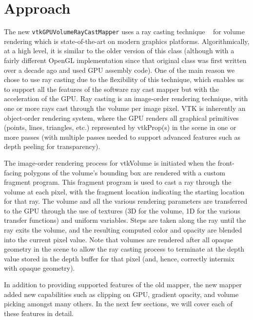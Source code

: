 \section{Approach}
\label{approach}
The new \texttt{vtkGPUVolumeRayCastMapper} uses a ray casting
technique ~\citep{engel_real-time_2006} for volume rendering which
is state-of-the-art on modern graphics platforms. Algorithmically, at a
high level, it is similar to the older version of this
class (although with a fairly different OpenGL implementation since that
original class was first written over a decade ago and used GPU assembly code).
One of the main reason we chose to use ray casting due to the flexibility of
this technique, which enables us to support all the features of the software ray
cast mapper but with the acceleration of the GPU. Ray casting is an image-order
rendering technique, with one or more rays cast through the volume per image
pixel. VTK is inherently an object-order rendering system, where the GPU renders
all graphical primitives (points, lines, triangles, etc.) represented by
vtkProp(s) in the scene in one or more passes (with multiple passes needed to
support advanced features such as depth peeling for transparency).

The image-order rendering process for vtkVolume is initiated when the
front-facing polygons of the volume’s bounding box are rendered with a custom
fragment program. This fragment program is used to cast a ray through the volume
at each pixel, with the fragment location indicating the starting location for
that ray. The volume and all the various rendering parameters are transferred to
the GPU through the use of textures (3D for the volume, 1D for the various
transfer functions) and uniform variables. Steps are taken along the ray until
the ray exits the volume, and the resulting computed color and opacity are
blended into the current pixel value. Note that volumes are rendered after all
opaque geometry in the scene to allow the ray casting process to terminate at
the depth value stored in the depth buffer for that pixel (and, hence, correctly
intermix with opaque geometry).

In addition to providing supported features of the old mapper, the new mapper
added new capabilities such as clipping on GPU,  gradient opacity, and volume
picking amongst many others. In the next few sections, we will cover each of
these features in detail.

